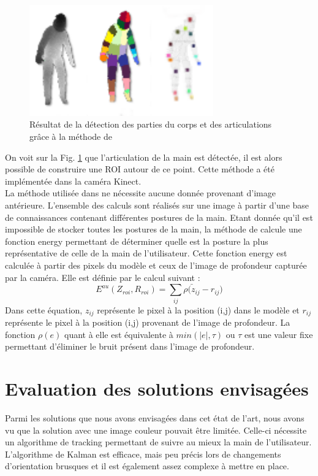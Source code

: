 \begin{figure}[!h]
 \begin{center}
  \includegraphics[width=300px]{images/bodyrecognition.png}
  \caption{Résultat de la détection des parties du corps et des articulations grâce à la méthode de \cite{export:145347}}
  \label{fig:bodyrecognition}
 \end{center}
\end{figure}

On voit sur la Fig. \ref{fig:bodyrecognition} que l'articulation de la main est détectée, il est alors possible de construire
une ROI autour de ce point. Cette méthode a été implémentée dans la caméra Kinect.\\

La méthode utilisée dans \cite{export:238453} ne nécessite aucune donnée provenant d'image antérieure. L'ensemble
des calculs sont réalisés sur une image à partir d'une base de connaissances contenant différentes postures de la
main. Etant donnée qu'il est impossible de stocker toutes les postures de la main, la méthode de \cite{export:238453}
calcule une fonction energy permettant de déterminer quelle est la posture la plus représentative de celle de la main
de l'utilisateur. Cette fonction energy est calculée à partir des pixels du modèle et ceux de l'image de profondeur
capturée par la caméra. Elle est définie par le calcul suivant :
\begin{equation}
 E^{au}(Z_{roi}, R_{roi}) = \sum_{ij} \bar{\rho(z_{ij}} - r_{ij})
\end{equation}
Dans cette équation, $z_{ij}$ représente le pixel à la position (i,j) dans le modèle et $r_{ij}$ représente le pixel à la position (i,j)
provenant de l'image de profondeur. La fonction $\rho(e)$ quant à elle est équivalente à $min(|e|,\tau)$ ou $\tau$ est une valeur fixe permettant d'éliminer le bruit présent dans l'image de profondeur.

\section{Evaluation des solutions envisagées}
Parmi les solutions que nous avons envisagées dans cet état de l'art, nous avons vu que la solution avec une 
image couleur pouvait être limitée. Celle-ci nécessite un algorithme de tracking permettant de suivre au mieux
la main de l'utilisateur. L'algorithme de Kalman est efficace, mais peu précis lors de changements d'orientation
brusques et il est également assez complexe à mettre en place.\\

